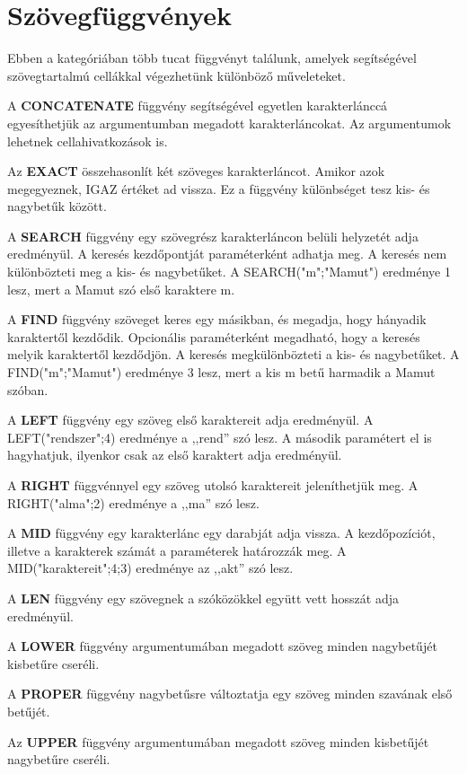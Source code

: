 \chapter{Szövegfüggvények}
\thispagestyle{empty}

Ebben a kategóriában több tucat függvényt találunk, amelyek
segítségével szövegtartalmú cellákkal végezhetünk
különböző műveleteket.

A \textbf{CONCATENATE} függvény segítségével egyetlen
karakterlánccá egyesíthetjük az  argumentumban megadott
karakterláncokat. Az argumentumok lehetnek cellahivatkozások is.

Az \textbf{EXACT} összehasonlít két szöveges karakterláncot.
Amikor azok megegyeznek, IGAZ értéket ad vissza. Ez a függvény
különbséget tesz kis- és nagybetűk között.

A \textbf{SEARCH} függvény egy szövegrész karakterláncon
belüli helyzetét adja eredményül. A keresés
kezdőpontját paraméterként adhatja meg.  A keresés nem
különbözteti meg a kis- és nagybetűket. A
SEARCH("m";"Mamut")
eredménye 1 lesz, mert a Mamut szó első karaktere  m.

A \textbf{FIND} függvény szöveget keres egy másikban, és
megadja, hogy hányadik karaktertől kezdődik. Opcionális
paraméterként megadható, hogy a keresés melyik karaktertől
kezdődjön. A keresés megkülönbözteti a kis- és
nagybetűket. A
FIND("m";"Mamut")
eredménye 3 lesz, mert a kis m betű harmadik a Mamut szóban.

A \textbf{LEFT} függvény egy szöveg első karaktereit adja
eredményül. A LEFT("rendszer";4) eredménye a ,,rend'' szó lesz. A második
paramétert el is hagyhatjuk, ilyenkor csak az első karaktert adja
eredményül.

A \textbf{RIGHT} függvénnyel egy szöveg utolsó karaktereit
jeleníthetjük meg. A RIGHT("alma";2) eredménye a ,,ma'' szó lesz.

A \textbf{MID} függvény egy karakterlánc egy darabját adja
vissza. A kezdőpozíciót, illetve a karakterek számát a
paraméterek határozzák meg. A MID("karaktereit";4;3)
eredménye az ,,akt'' szó lesz.

A \textbf{LEN} függvény egy szövegnek a szóközökkel együtt
vett hosszát adja eredményül.

A \textbf{LOWER} függvény argumentumában megadott szöveg minden
nagybetűjét kisbetűre cseréli.

A \textbf{PROPER} függvény nagybetűsre változtatja egy
szöveg minden szavának első betűjét.

Az \textbf{UPPER} függvény argumentumában megadott szöveg minden
kisbetűjét nagybetűre cseréli.

